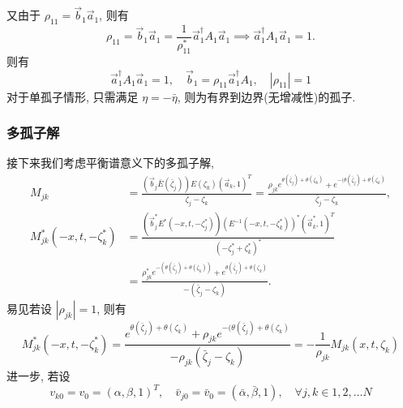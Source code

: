又由于 $\rho_{11} = \vec{b}_{1}\vec{a}_{1}$, 则有
\begin{equation}
    \rho_{11} = \vec{b}_{1} \vec{a}_{1} =
    \frac{1}{\rho_{11}^{*}} \vec{a}_{1}^{\dagger} A_{1} \vec{a}_{1} \implies\vec{a}_{1}^{\dagger}A_{1} \vec{a}_{1} = 1.
\end{equation}
则有
\begin{equation}
    \vec{a}_{1}^{\dagger} A_{1} \vec{a}_{1} = 1, \quad \vec{b}_{1} = \rho_{11} \vec{a}_{1}^{\dagger} A_{1}, \quad |\rho_{11}| = 1
\end{equation}
对于单孤子情形, 只需满足 $\eta = -\bar{\eta}$, 则为有界到边界(无增减性)的孤子.
\subsubsection{多孤子解}
接下来我们考虑平衡谱意义下的多孤子解,
\begin{equation}
    \begin{aligned}
        M_{jk}                            & = \frac{(\vec{b}_{j} \bar{E}(\bar{\zeta}_{j})) E(\zeta_{k}) (\vec{a}_{k}, 1)^{T}}{\bar{\zeta}_{j} - \zeta_{k}} = \frac{\rho_{jk} e^{\theta(\bar{\zeta}_{j}) + \theta(\zeta_{k})} + e^{-( \theta(\bar{\zeta}_{j}) + \theta(\zeta_{k})}}{\bar{\zeta}_{j} - \zeta_{k}}, \\
        M_{jk}^{*}(-x, t, -\zeta_{k}^{*}) & = \frac{(\vec{b}_{j}^{*} E^{*}(-x, t, -\zeta_{j}^{*})) (E^{-1}(-x, t, -\zeta_{k}^{*}))^{*} (\vec{a}_{k}^{*}, 1)^{T}}{(-\zeta_{j}^{*} + \zeta_{k}^{*})^{*}}                                                                                                           \\
                                          & = \frac{\rho_{jk}^{*} e^{-(\theta(\bar{\zeta}_{j}) + \theta(\zeta_{k}))} + e^{\theta(\bar{\zeta}_{j}) + \theta(\zeta_{k})}}{-(\bar{\zeta}_{j} - \zeta_{k})}.
    \end{aligned}
\end{equation}
易见若设 $|\rho_{jk}| = 1$, 则有
\begin{equation}
    M_{jk}^{*}(-x,t, -\zeta_{k}^{*}) = \frac{e^{\theta(\bar{\zeta}_{j}) + \theta(\zeta_{k})} + \rho_{jk}e^{-( \theta(\bar{\zeta}_{j}) + \theta(\zeta_{k})}}{-\rho_{jk}(\bar{\zeta}_{j} - \zeta_{k})} = - \frac{1}{\rho_{jk}} M_{jk}(x,t,\zeta_{k})
\end{equation}
进一步, 若设
\begin{equation}
    v_{k0} = v_{0} = (\alpha, \beta, 1)^{T}, \quad \bar{v}_{j0} = \bar{v}_{0} = (\bar{\alpha}, \bar{\beta}, 1), \quad \forall j, k \in 1, 2, \dots N
\end{equation}
